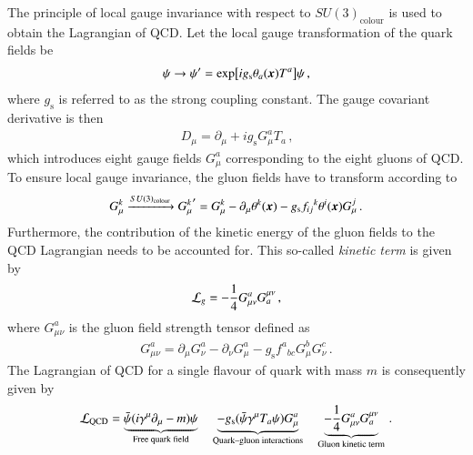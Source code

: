 The principle of local gauge invariance with respect to $SU(3)_{\text{colour}}$
is used to obtain the Lagrangian of QCD. Let the local gauge transformation of
the quark fields be
\begin{align*}
  \psi \to \psi^\prime = \exp[ i g_{\text{s}} \theta_a(\myvec{x}) T^a] \psi \,\text{,}
\end{align*}
where $g_{\text{s}}$ is referred to as the strong coupling constant. The gauge
covariant derivative is then
\begin{align*}
  D_\mu = \partial_\mu + i g_{\text{s}} G_\mu^a T_a \,\text{,}
\end{align*}
which introduces eight gauge fields $G_\mu^a$ corresponding to the eight gluons
of QCD. To ensure local gauge invariance, the gluon fields have to transform
according to
\begin{align*}
  G_\mu^k \xrightarrow{SU(3)_{\text{colour}}} {G_\mu^k}^\prime = G_\mu^k  - \partial_\mu \theta^k(\myvec{x}) - g_{\text{s}} {f_{ij}}^k \theta^i(\myvec{x}) G_\mu^j \,\text{.}
\end{align*}
Furthermore, the contribution of the kinetic energy of the gluon fields to the
QCD Lagrangian needs to be accounted for. This so-called \emph{kinetic term} is
given by
\begin{align*}
  \mathcal{L}_{g} = - \frac{1}{4} G_{\mu\nu}^{a} G^{\mu\nu}_{a} \,\text{,}
\end{align*}
where $G_{\mu\nu}^a$ is the gluon field strength tensor defined as
\begin{align*}
  G_{\mu\nu}^a = \partial_\mu G_\nu^a - \partial_\nu G_\mu^a - g_{\text{s}} {f^{a}}_{bc} G_\mu^b G_\nu ^c \,\text{.}
\end{align*}
The Lagrangian of QCD for a single flavour of quark with mass $m$ is
consequently given by
\begin{align*}
  \mathcal{L}_{\text{QCD}} =
  \underbrace{\bar{\psi} (i \gamma^\mu \partial_\mu - m) \psi}_{\text{Free quark field}}
  \hspace*{1em}
  \underbrace{- g_{\text{s}} (\bar{\psi} \gamma^\mu T_a \psi) G_\mu^a}_{\text{Quark--gluon interactions}}
  \hspace*{1em}
  \underbrace{- \frac{1}{4} G_{\mu\nu}^a G^{\mu\nu}_a}_{\text{Gluon kinetic term}} \,\text{.}
\end{align*}
